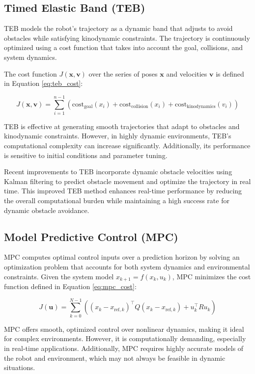 \documentclass[conference]{IEEEtran}
\begin{document}
\subsection{Timed Elastic Band (TEB)}
TEB models the robot’s trajectory as a dynamic band that adjusts to avoid obstacles while satisfying kinodynamic constraints. The trajectory is continuously optimized using a cost function that takes into account the goal, collisions, and system dynamics.

The cost function \(J(\mathbf{x}, \mathbf{v})\) over the series of poses \(\mathbf{x}\) and velocities \(\mathbf{v}\) is defined in Equation \eqref{eq:teb_cost}:

\begin{equation}
\label{eq:teb_cost}
J(\mathbf{x}, \mathbf{v}) = \sum_{i=1}^{n-1} \left( \text{cost}_{\text{goal}}(x_i) + \text{cost}_{\text{collision}}(x_i) + \text{cost}_{\text{kinodynamics}}(v_i) \right)
\end{equation}

TEB is effective at generating smooth trajectories that adapt to obstacles and kinodynamic constraints. However, in highly dynamic environments, TEB's computational complexity can increase significantly. Additionally, its performance is sensitive to initial conditions and parameter tuning.

Recent improvements to TEB incorporate dynamic obstacle velocities using Kalman filtering to predict obstacle movement and optimize the trajectory in real time. This improved TEB method \cite{chen2021dynamic} enhances real-time performance by reducing the overall computational burden while maintaining a high success rate for dynamic obstacle avoidance.

\subsection{Model Predictive Control (MPC)}
MPC computes optimal control inputs over a prediction horizon by solving an optimization problem that accounts for both system dynamics and environmental constraints. Given the system model \(x_{k+1} = f(x_k, u_k)\), MPC minimizes the cost function defined in Equation \eqref{eq:mpc_cost}:

\begin{equation}
\label{eq:mpc_cost}
J(\mathbf{u}) = \sum_{k=0}^{N-1} \left( (x_k - x_{\text{ref},k})^\top Q (x_k - x_{\text{ref},k}) + u_k^\top R u_k \right)
\end{equation}

MPC offers smooth, optimized control over nonlinear dynamics, making it ideal for complex environments. However, it is computationally demanding, especially in real-time applications. Additionally, MPC requires highly accurate models of the robot and environment, which may not always be feasible in dynamic situations.
\end{document}
